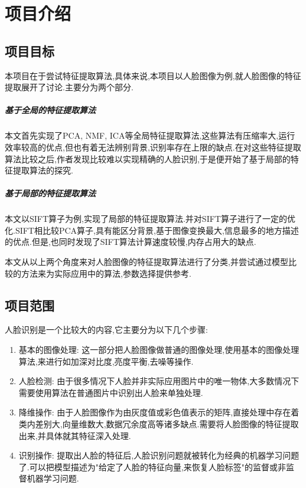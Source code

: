 \chapter{项目介绍}

\section{项目目标}

本项目在于尝试特征提取算法,具体来说,本项目以人脸图像为例,就人脸图像的特征提取展开了讨论.主要分为两个部分.
\paragraph{基于全局的特征提取算法} 本文首先实现了PCA, NMF, ICA等全局特征提取算法,这些算法有压缩率大,运行效率较高的优点,但也有着无法辨别背景,识别率存在上限的缺点.在对这些特征提取算法比较之后,作者发现比较难以实现精确的人脸识别,于是便开始了基于局部的特征提取算法的探究.
\paragraph{基于局部的特征提取算法} 本文以SIFT算子为例,实现了局部的特征提取算法.并对SIFT算子进行了一定的优化.SIFT相比较PCA算子,具有能区分背景,基于图像变换最大,信息最多的地方描述的优点.但是,也同时发现了SIFT算法计算速度较慢,内存占用大的缺点.\newline


本文从以上两个角度来对人脸图像的特征提取算法进行了分类,并尝试通过模型比较的方法来为实际应用中的算法,参数选择提供参考.


\section{项目范围}
人脸识别是一个比较大的内容,它主要分为以下几个步骤:
\begin{enumerate}
	\item{基本的图像处理:} 这一部分把人脸图像做普通的图像处理,使用基本的图像处理算法,来进行如加深对比度,亮度平衡,去噪等操作.
	\item{人脸检测:} 由于很多情况下人脸并非实际应用图片中的唯一物体,大多数情况下需要使用算法在普通图片中识别出人脸来单独处理.
	\item{降维操作:}  由于人脸图像作为由灰度值或彩色值表示的矩阵,直接处理中存在着类内差别大,向量维数大,数据冗余度高等诸多缺点.需要将人脸图像的特征提取出来,并具体就其特征深入处理.
	\item{识别操作:} 提取出人脸的特征后,人脸识别问题就被转化为经典的机器学习问题了.可以把模型描述为"给定了人脸的特征向量,来恢复人脸标签"的监督或非监督机器学习问题.
\end{enumerate}


